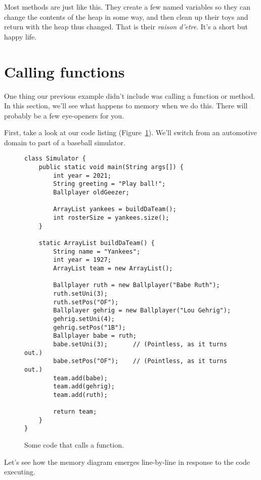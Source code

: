 Most methods are just like this. They create a few named variables so they can
change the contents of the heap in some way, and then clean up their toys
and return with the heap thus changed. That is their \textit{raison d'etre}.
It's a short but happy life.


\section{Calling functions}

One thing our previous example didn't include was calling a function or
method. In this section, we'll see what happens to memory when we do this.
There will probably be a few eye-openers for you.

First, take a look at our code listing (Figure~\ref{fig:functionCode}). We'll
switch from an automotive domain to part of a baseball simulator.

\begin{figure}
\centering
\begin{Verbatim}[fontsize=\footnotesize,samepage=true,frame=single]
class Simulator {
    public static void main(String args[]) {
        int year = 2021;
        String greeting = "Play ball!";
        Ballplayer oldGeezer;

        ArrayList yankees = buildDaTeam();
        int rosterSize = yankees.size();
    }

    static ArrayList buildDaTeam() {
        String name = "Yankees";
        int year = 1927;
        ArrayList team = new ArrayList();

        Ballplayer ruth = new Ballplayer("Babe Ruth");
        ruth.setUni(3);
        ruth.setPos("OF");
        Ballplayer gehrig = new Ballplayer("Lou Gehrig");
        gehrig.setUni(4);
        gehrig.setPos("1B");
        Ballplayer babe = ruth;
        babe.setUni(3);       // (Pointless, as it turns out.)
        babe.setPos("OF");    // (Pointless, as it turns out.)
        team.add(babe);
        team.add(gehrig);
        team.add(ruth);
        
        return team;
    }
}
\end{Verbatim}
\caption{Some code that calls a function.}
\label{fig:functionCode}
\end{figure}

Let's see how the memory diagram emerges line-by-line in response to the code
executing.

